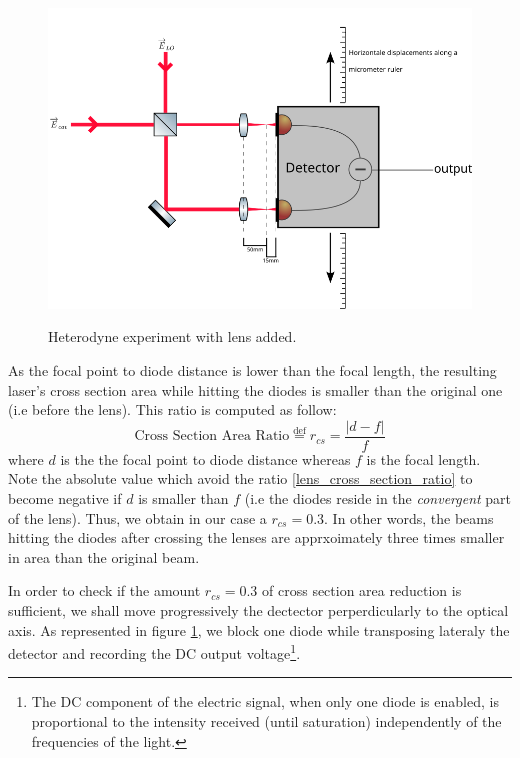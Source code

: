 \documentclass[12pt]{report}
\begin{document}
\begin{figure}[h!]
\caption{Heterodyne experiment with lens added.}
\centering
\includegraphics[width=\textwidth]{heterodyne-lens}
\label{fig:heterodyne-lens}
\end{figure}

As the focal point to diode distance is lower than the focal length, the resulting laser's cross section area while hitting the diodes is smaller than the original one (i.e before the lens). This ratio is computed as follow:
\begin{equation}
\label{lens_cross_section_ratio}
\textrm{Cross Section Area Ratio} \stackrel{\text{def}}{=} r_{cs} = \frac{\vert d-f \vert}{f}
\end{equation}
where $d$ is the the focal point to diode distance whereas $f$ is the focal length. Note the absolute value which avoid the ratio \eqref{lens_cross_section_ratio} to become negative if $d$ is smaller than $f$ (i.e the diodes reside in the \textit{convergent} part of the lens). Thus, we obtain in our case a $r_{cs} = 0.3$. In other words, the beams hitting the diodes after crossing the lenses are apprxoimately three times smaller in area than the original beam.

In order to check if the amount $r_{cs} = 0.3$ of cross section area reduction is sufficient, we shall move progressively the dectector perperdicularly to the optical axis. As represented in figure \ref{fig:heterodyne-lens}, we block one diode while transposing lateraly the detector and recording the DC output voltage\footnote{The DC component of the electric signal, when only one diode is enabled, is proportional to the intensity received (until saturation) independently of the frequencies of the light. }.
\end{document}
